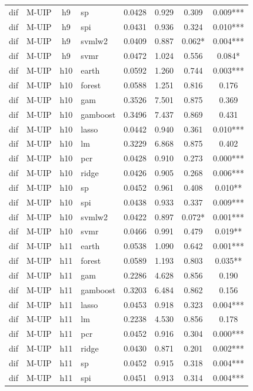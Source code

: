 \begin{ThreePartTable}
\begin{longtable}[t]{llclcccc}
dif & M-UIP & h9 & sp & 0.0428 & 0.929 & 0.309 & 0.009***\\
dif & M-UIP & h9 & spi & 0.0431 & 0.936 & 0.324 & 0.010***\\
dif & M-UIP & h9 & svmlw2 & 0.0409 & 0.887 & 0.062* & 0.004***\\
dif & M-UIP & h9 & svmr & 0.0472 & 1.024 & 0.556 & 0.084*\\
\addlinespace
dif & M-UIP & h10 & earth & 0.0592 & 1.260 & 0.744 & 0.003***\\
dif & M-UIP & h10 & forest & 0.0588 & 1.251 & 0.816 & 0.176\\
dif & M-UIP & h10 & gam & 0.3526 & 7.501 & 0.875 & 0.369\\
dif & M-UIP & h10 & gamboost & 0.3496 & 7.437 & 0.869 & 0.431\\
dif & M-UIP & h10 & lasso & 0.0442 & 0.940 & 0.361 & 0.010***\\
dif & M-UIP & h10 & lm & 0.3229 & 6.868 & 0.875 & 0.402\\
dif & M-UIP & h10 & pcr & 0.0428 & 0.910 & 0.273 & 0.000***\\
dif & M-UIP & h10 & ridge & 0.0426 & 0.905 & 0.268 & 0.006***\\
dif & M-UIP & h10 & sp & 0.0452 & 0.961 & 0.408 & 0.010**\\
dif & M-UIP & h10 & spi & 0.0438 & 0.933 & 0.337 & 0.009***\\
dif & M-UIP & h10 & svmlw2 & 0.0422 & 0.897 & 0.072* & 0.001***\\
dif & M-UIP & h10 & svmr & 0.0466 & 0.991 & 0.479 & 0.019**\\
\addlinespace
dif & M-UIP & h11 & earth & 0.0538 & 1.090 & 0.642 & 0.001***\\
dif & M-UIP & h11 & forest & 0.0589 & 1.193 & 0.803 & 0.035**\\
dif & M-UIP & h11 & gam & 0.2286 & 4.628 & 0.856 & 0.190\\
dif & M-UIP & h11 & gamboost & 0.3203 & 6.484 & 0.862 & 0.156\\
dif & M-UIP & h11 & lasso & 0.0453 & 0.918 & 0.323 & 0.004***\\
dif & M-UIP & h11 & lm & 0.2238 & 4.530 & 0.856 & 0.178\\
dif & M-UIP & h11 & pcr & 0.0452 & 0.916 & 0.304 & 0.000***\\
dif & M-UIP & h11 & ridge & 0.0430 & 0.871 & 0.201 & 0.002***\\
dif & M-UIP & h11 & sp & 0.0452 & 0.915 & 0.318 & 0.004***\\
dif & M-UIP & h11 & spi & 0.0451 & 0.913 & 0.314 & 0.004***\\

\end{longtable}
\end{ThreePartTable}
